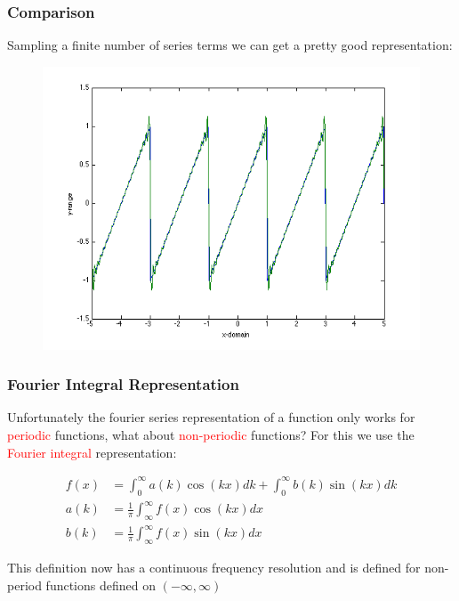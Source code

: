 \documentclass[serif]{beamer}
\begin{document}
\begin{frame}
\frametitle{Comparison}

Sampling a finite number of series terms we can get a pretty good representation: 

\begin{figure}
\includegraphics[width=\textwidth,height=0.7\textheight]{./sawtooth}
\end{figure}

\end{frame}



\begin{frame}
\frametitle{Fourier Integral Representation}

Unfortunately the fourier series representation of a function only works for \textcolor{red}{periodic} functions, what about \textcolor{red}{non-periodic} functions? For this we use the \textcolor{red}{Fourier integral} representation: 


\begin{align*}
f(x) &= \int^{\infty}_{0} a(k) \cos(kx)dk + \int^{\infty}_0 b(k) \sin (kx)dk\\
a(k) &= \frac{1}{\pi}\int^{\infty}_{\infty}f(x)\cos (kx) dx\\
b(k) &= \frac{1}{\pi}\int^{\infty}_{\infty}f(x)\sin (kx) dx
\end{align*}

This definition now has a continuous frequency resolution and is defined for non-period functions defined on $(-\infty,\infty)$
\end{frame}
\end{document}
